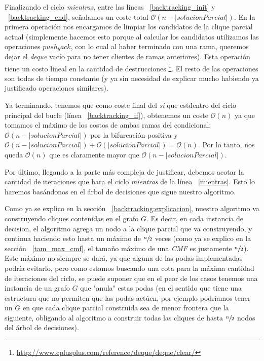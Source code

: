 \par Finalizando el ciclo \emph{mientras}, entre las l\'ineas ~\ref{backtracking_init} y
    ~\ref{backtracking_end}, se\~nalamos un coste total $\mathcal O(n -|solucionParcial|)$.
    En la primera operaci\'on nos encargamos de limpiar los candidatos de la clique
    parcial actual (simplemente hacemos esto porque al calcular los candidatos
    utilizamos las operaciones $push_back$, con lo cual al haber terminado con una rama,
    queremos dejar el \emph{deque} vac\'io para no tener clientes de ramas
    anteriores). Esta operaci\'on tiene un costo lineal en la cantidad de destrucciones%
    \footnote{\url{http://www.cplusplus.com/reference/deque/deque/clear/}}. El resto
    de las operaciones son todas de tiempo constante (y ya sin necesidad de explicar
    mucho habiendo ya justificado operaciones similares).

\par Ya terminando, tenemos que como coste final del \emph{si} que est\' dentro
    del ciclo principal del bucle (l\'inea ~\ref{backtracking_if}), obtenemos un
    coste $\mathcal O(n)$ ya que tomamos el m\'aximo de los costos de ambas
    ramas del condicional: $\mathcal O(n-|solucionParcial|)$ por la bifurcaci\'on
    positiva y $\mathcal O(n-|solucionParcial|) + \mathcal O(|solucionParcial|) =
    \mathcal O(n)$. Por lo tanto, nos queda $\mathcal O(n)$ que es claramente
    mayor que $\mathcal O(n-|solucionParcial|)$.

\par Por \'ultimo, llegando a la parte m\'as compleja de justificar, debemos
    acotar la cantidad de iteraciones que hara el ciclo \emph{mientras} de la
    l\'inea ~\ref{mientras}. Esto lo haremos bas\'andonos en el \'arbol de
    decisiones que sigue nuestro algoritmo.

\par Como ya se explico en la secci\'on ~\ref{backtracking:explicacion}, nuestro
    algoritmo va construyendo cliques contenidas en el grafo $G$. Es decir, en cada
    instancia de decision, el algoritmo agrega un nodo a la clique parcial que va
    construyendo, y continua haciendo esto hasta un m\'aximo de $\sfrac{n}{2}$
    veces (como ya se explico en la secci\'on ~\ref{tam_max_cmf}, el tama\~no
    m\'aximo de una \emph{CMF} es justamente $\sfrac{n}{2}$). Este m\'aximo no
    siempre se dar\'a, ya que alguna de las podas implementadas podr\'ia evitarlo,
    pero como estamos buscando una cota para la m\'axima cantidad de iteraciones
    del ciclo, se puede suponer que en el peor de los casos tenemos una instancia
    de un grafo $G$ que "anula" estas podas (en el sentido que tiene una estructura
    que no permiten que las podas act\'uen, por ejemplo podr\'iamos tener un $G$ en
    que cada clique parcial constru\'ida sea de menor frontera que la siguiente,
    obligando al algoritmo a construir todas las cliques de hasta $\sfrac{n}{2}$
    nodos del \'arbol de decisiones).

